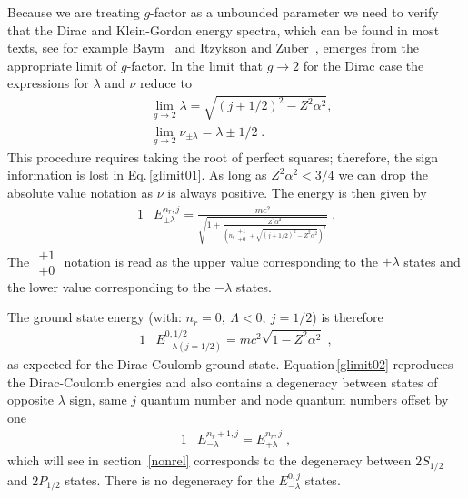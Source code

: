 Because we are treating $g$-factor as a unbounded parameter we need to verify that the Dirac and Klein-Gordon energy spectra, which can be found in most texts, see for example Baym~\cite{b69} and Itzykson and Zuber~\cite{iz80}, emerges from the appropriate limit of $g$-factor. In the limit that $g\rightarrow2$ for the Dirac case the expressions for $\lambda$ and $\nu$ reduce to
\begin{subequations}
\begin{alignat}{1}
\label{glimit01} &\lim_{g\rightarrow2}\lambda=\sqrt{\displaystyle(j+1/2)^{2}-Z^{2}\alpha^{2}},\\
&\lim_{g\rightarrow2}\nu_{\pm\lambda}=\lambda\pm1/2\;.
\end{alignat}
\end{subequations}
This procedure requires taking the root of perfect squares; therefore, the sign information is lost in Eq.\,\eqref{glimit01}. As long as $Z^{2}\alpha^{2}<3/4$ we can drop the absolute value notation as $\nu$ is always positive. The energy is then given by
\begin{alignat}{1}
\label{glimit02} &E_{\pm\lambda}^{n_{r},j}=\frac{mc^{2}}{\sqrt{1+\displaystyle\frac{Z^{2}\alpha^{2}}{\left(n_{r}\begin{smallmatrix} +1 \\ +0 \end{smallmatrix}+\sqrt{\displaystyle(j+1/2)^{2}-Z^{2}\alpha^{2}}\right)^{2}}}}\;.
\end{alignat}
The $\begin{smallmatrix} +1 \\ +0 \end{smallmatrix}$ notation is read as the upper value corresponding to the $+\lambda$ states and the lower value corresponding to the $-\lambda$ states. 

The ground state energy (with: $n_{r}=0,\ \Lambda<0,\ j=1/2$) is therefore
\begin{alignat}{1}
\label{glimit07} &E^{0,1/2}_{-\lambda(j=1/2)}=mc^{2}\sqrt{1-Z^{2}\alpha^{2}}\;,\end{alignat}
as expected for the Dirac-Coulomb ground state. Equation\,\eqref{glimit02} reproduces the Dirac-Coulomb energies and also contains a degeneracy between states of opposite $\lambda$ sign, same $j$ quantum number and node quantum numbers offset by one
\begin{alignat}{1}
\label{glimit03} &E^{n_{r}+1,j}_{-\lambda}=E^{n_{r},j}_{+\lambda}\;,\end{alignat}
which will see in section~\ref{nonrel} corresponds to the degeneracy between $2S_{1/2}$ and $2P_{1/2}$ states. There is no degeneracy for the $E^{0,j}_{-\lambda}$ states. 

